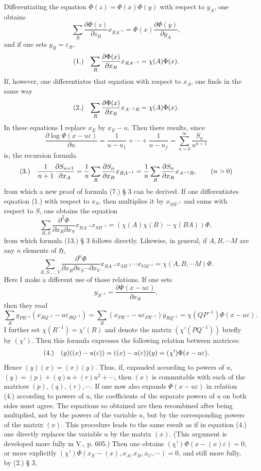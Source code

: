 \documentclass[11pt]{article}
\makeatletter
\newcommand{\Hgrp}{\mathfrak{H}}
\newcommand{\frobtag}[2]{\[\begin{array}{@{}r@{\quad}l@{}}\textup{(#1)} & \displaystyle #2\end{array}\]}
\newcommand{\frobtagc}[2]{\[\begin{array}{@{}r@{\quad}c@{}}\textup{(#1)} & \displaystyle #2\end{array}\]}
\makeatother
\begin{document}
Differentiating the equation $\Phi(z)=\Phi(x)\Phi(y)$ with respect to $y_A$, one obtains
\[
\sum_R\frac{\partial\Phi(z)}{\partial z_R}x_{RA^{-1}}=\Phi(x)\frac{\partial\Phi(y)}{\partial y_A},
\]
and if one sets $y_R=\varepsilon_R$,
\frobtagc{1.}{\sum_R\frac{\partial\Phi(x)}{\partial x_R}x_{RA^{-1}}=\chi(A)\Phi(x).}
If, however, one differentiates that equation with respect to $x_A$, one finds in the same way
\frobtagc{2.}{\sum_R\frac{\partial\Phi(x)}{\partial x_R}x_{A^{-1}R}=\chi(A)\Phi(x).}
In these equations I replace $x_E$ by $x_E-u$. Then there results, since
\[
\frac{\partial\log\Phi(x-u\varepsilon)}{\partial u}=\frac{1}{u-u_1}+\cdots+\frac{1}{u-u_f}=\sum_{n=0}^{\infty}\frac{S_n}{u^{n+1}}
\]
is, the recursion formula
\frobtag{3.}{\frac{1}{n+1}\frac{\partial S_{n+1}}{\partial x_A}=\frac{1}{n}\sum_R\frac{\partial S_n}{\partial x_R}x_{RA^{-1}}=\frac{1}{n}\sum_R\frac{\partial S_n}{\partial x_R}x_{A^{-1}R},\qquad(n>0)}
from which a new proof of formula (7.) § 3 can be derived. If one differentiates equation (1.) with respect to $x_S$, then multiplies it by $x_{SB^{-1}}$ and sums with respect to $S$, one obtains the equation
\[
\sum_{R,S}\frac{\partial^2\Phi}{\partial x_R\partial x_S}x_{RA^{-1}}x_{SB^{-1}}=(\chi(A)\chi(B)-\chi(BA))\Phi,
\]
from which formula (13.) § 3 follows directly. Likewise, in general, if $A,B,\cdots M$ are any $n$ elements of $\Hgrp$,
\[
\sum_{R,S,\ldots,V}\frac{\partial^n\Phi}{\partial x_R\partial x_S\cdots\partial x_V}x_{RA^{-1}}x_{SB^{-1}}\cdots x_{VM^{-1}}=\chi(A,B,\cdots M)\Phi.
\]
Here I make a different use of those relations. If one sets
\[
y_{R^{-1}}=\frac{\partial\Phi(x-u\varepsilon)}{\partial x_R},
\]
then they read
\[
\sum_R y_{PR^{-1}}(x_{RQ^{-1}}-u\varepsilon_{RQ^{-1}})=\sum_R(x_{PR^{-1}}-u\varepsilon_{PR^{-1}})y_{RQ^{-1}}=\chi(QP^{-1})\Phi(x-u\varepsilon).
\]
I further set $\chi(R^{-1})=\chi'(R)$ and denote the matrix $(\chi'(PQ^{-1}))$ briefly by $(\chi')$. Then this formula expresses the following relation between matrices:
\frobtagc{4.}{(y)((x)-u(\varepsilon))=((x)-u(\varepsilon))(y)=(\chi')\Phi(x-u\varepsilon).}
Hence $(y)(x)=(x)(y)$. Thus, if, expanded according to powers of $u$, $(y)=(p)+(q)u+(r)u^2+\cdots$, then $(x)$ is commutable with each of the matrices $(p),(q),(r),\cdots$. If one now also expands $\Phi(x-u\varepsilon)$ in relation (4.) according to powers of $u$, the coefficients of the separate powers of $u$ on both sides must agree. The equations so obtained are then recombined after being multiplied, not by the powers of the variable $u$, but by the corresponding powers of the matrix $(x)$. This procedure leads to the same result as if in equation (4.) one directly replaces the variable $u$ by the matrix $(x)$. (This argument is developed more fully in V., p. 605.) Then one obtains $(\chi')\Phi(x-(x)\varepsilon)=0$, or more explicitly $(\chi')\Phi(x_E-(x),x_A,x_B,x_C,\cdots)=0$, and still more fully, by (2.) § 3,
\end{document}
